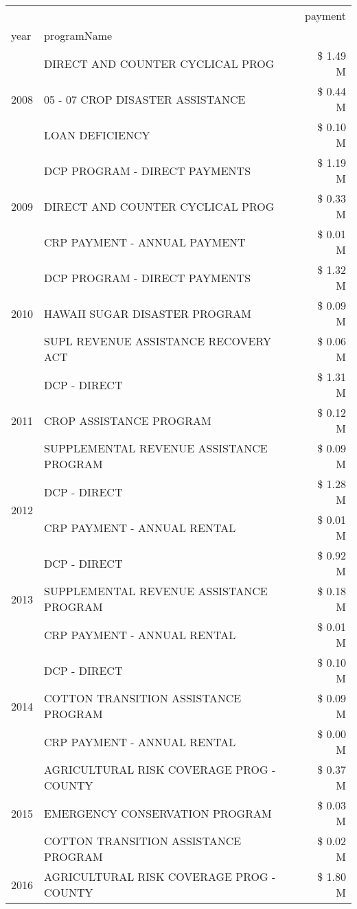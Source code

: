 \begin{tabular}{llr}
\toprule
 &  & payment \\
year & programName &  \\
\midrule
\multirow[t]{3}{*}{2008} & DIRECT AND COUNTER CYCLICAL PROG & \$ 1.49 M \\
 & 05 - 07 CROP DISASTER ASSISTANCE & \$ 0.44 M \\
 & LOAN DEFICIENCY & \$ 0.10 M \\
\cline{1-3}
\multirow[t]{3}{*}{2009} & DCP PROGRAM - DIRECT PAYMENTS & \$ 1.19 M \\
 & DIRECT AND COUNTER CYCLICAL PROG & \$ 0.33 M \\
 & CRP PAYMENT - ANNUAL PAYMENT & \$ 0.01 M \\
\cline{1-3}
\multirow[t]{3}{*}{2010} & DCP PROGRAM - DIRECT PAYMENTS & \$ 1.32 M \\
 & HAWAII SUGAR DISASTER PROGRAM & \$ 0.09 M \\
 & SUPL REVENUE ASSISTANCE RECOVERY ACT & \$ 0.06 M \\
\cline{1-3}
\multirow[t]{3}{*}{2011} & DCP - DIRECT & \$ 1.31 M \\
 & CROP ASSISTANCE PROGRAM & \$ 0.12 M \\
 & SUPPLEMENTAL REVENUE ASSISTANCE PROGRAM & \$ 0.09 M \\
\cline{1-3}
\multirow[t]{2}{*}{2012} & DCP - DIRECT & \$ 1.28 M \\
 & CRP PAYMENT - ANNUAL RENTAL & \$ 0.01 M \\
\cline{1-3}
\multirow[t]{3}{*}{2013} & DCP - DIRECT & \$ 0.92 M \\
 & SUPPLEMENTAL REVENUE ASSISTANCE PROGRAM & \$ 0.18 M \\
 & CRP PAYMENT - ANNUAL RENTAL & \$ 0.01 M \\
\cline{1-3}
\multirow[t]{3}{*}{2014} & DCP - DIRECT & \$ 0.10 M \\
 & COTTON TRANSITION ASSISTANCE PROGRAM & \$ 0.09 M \\
 & CRP PAYMENT - ANNUAL RENTAL & \$ 0.00 M \\
\cline{1-3}
\multirow[t]{3}{*}{2015} & AGRICULTURAL RISK COVERAGE PROG - COUNTY & \$ 0.37 M \\
 & EMERGENCY CONSERVATION PROGRAM & \$ 0.03 M \\
 & COTTON TRANSITION ASSISTANCE PROGRAM & \$ 0.02 M \\
\cline{1-3}
\multirow[t]{3}{*}{2016} & AGRICULTURAL RISK COVERAGE PROG - COUNTY & \$ 1.80 M \\

\end{tabular}
